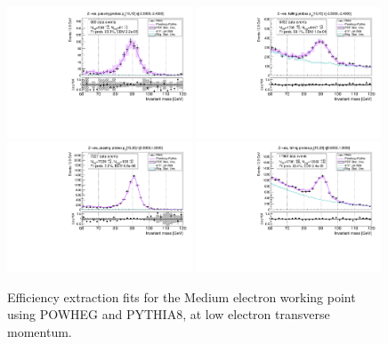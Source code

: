 {\begin{figure}
\centering
\includegraphics[width=0.49\textwidth]{figures/Zee_PowhegPythia_BkgLPiEMu_pass_ptBin0_etaBin0.pdf}
\includegraphics[width=0.49\textwidth]{figures/Zee_PowhegPythia_BkgLPiEMu_fail_ptBin0_etaBin0.pdf}
\includegraphics[width=0.49\textwidth]{figures/Zee_PowhegPythia_BkgLPiEMu_pass_ptBin1_etaBin19.pdf}
\includegraphics[width=0.49\textwidth]{figures/Zee_PowhegPythia_BkgLPiEMu_fail_ptBin1_etaBin19.pdf}
\caption{Efficiency extraction fits for the Medium electron working point using POWHEG and PYTHIA8, at low electron transverse momentum.}
\label{fig:ZeeAltSigFSRFits1}
\end{figure}
\begin{figure}

\end{figure}}
